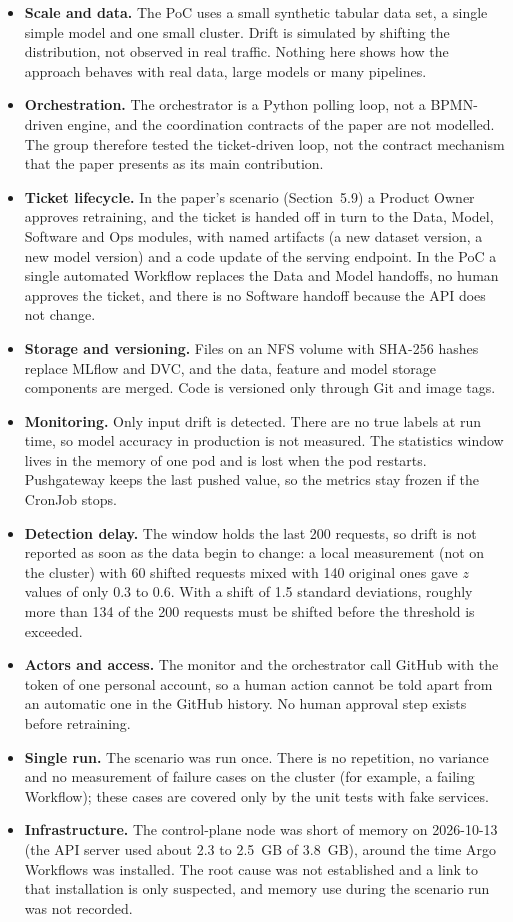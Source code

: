\begin{itemize}
  \item \textbf{Scale and data.} The PoC uses a small synthetic tabular data set, a single simple model and one small cluster. Drift is simulated by shifting the distribution, not observed in real traffic. Nothing here shows how the approach behaves with real data, large models or many pipelines.
  \item \textbf{Orchestration.} The orchestrator is a Python polling loop, not a BPMN-driven engine, and the coordination contracts of the paper are not modelled. The group therefore tested the ticket-driven loop, not the contract mechanism that the paper presents as its main contribution.
  \item \textbf{Ticket lifecycle.} In the paper's scenario (Section~5.9) a Product Owner approves retraining, and the ticket is handed off in turn to the Data, Model, Software and Ops modules, with named artifacts (a new dataset version, a new model version) and a code update of the serving endpoint. In the PoC a single automated Workflow replaces the Data and Model handoffs, no human approves the ticket, and there is no Software handoff because the API does not change.
  \item \textbf{Storage and versioning.} Files on an NFS volume with SHA-256 hashes replace MLflow and DVC, and the data, feature and model storage components are merged. Code is versioned only through Git and image tags.
  \item \textbf{Monitoring.} Only input drift is detected. There are no true labels at run time, so model accuracy in production is not measured. The statistics window lives in the memory of one pod and is lost when the pod restarts. Pushgateway keeps the last pushed value, so the metrics stay frozen if the CronJob stops.
  \item \textbf{Detection delay.} The window holds the last 200 requests, so drift is not reported as soon as the data begin to change: a local measurement (not on the cluster) with 60 shifted requests mixed with 140 original ones gave $z$ values of only 0.3 to 0.6. With a shift of 1.5 standard deviations, roughly more than 134 of the 200 requests must be shifted before the threshold is exceeded.
  \item \textbf{Actors and access.} The monitor and the orchestrator call GitHub with the token of one personal account, so a human action cannot be told apart from an automatic one in the GitHub history. No human approval step exists before retraining.
  \item \textbf{Single run.} The scenario was run once. There is no repetition, no variance and no measurement of failure cases on the cluster (for example, a failing Workflow); these cases are covered only by the unit tests with fake services.
  \item \textbf{Infrastructure.} The control-plane node was short of memory on 2026-10-13 (the API server used about 2.3 to 2.5~GB of 3.8~GB), around the time Argo Workflows was installed. The root cause was not established and a link to that installation is only suspected, and memory use during the scenario run was not recorded.
\end{itemize}

